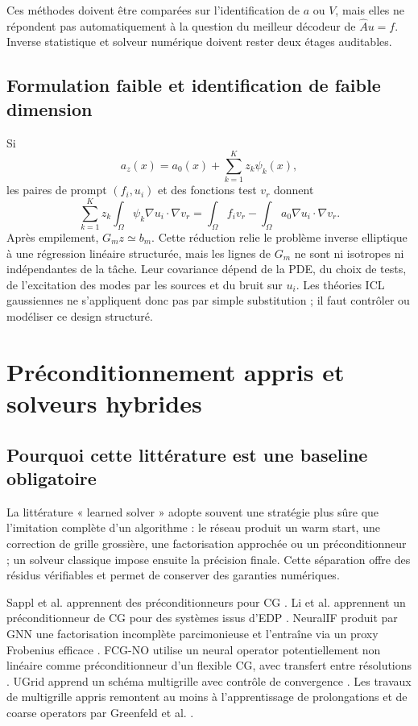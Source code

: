 \documentclass[11pt,a4paper]{article}
\begin{document}
Ces méthodes doivent être comparées sur l'identification de $a$ ou $V$, mais
elles ne répondent pas automatiquement à la question du meilleur décodeur de
$\widehat A u=f$. Inverse statistique et solveur numérique doivent rester deux
étages auditables.

\subsection{Formulation faible et identification de faible dimension}

Si
\[
  a_z(x)=a_0(x)+\sum_{k=1}^K z_k\psi_k(x),
\]
les paires de prompt $(f_i,u_i)$ et des fonctions test $v_r$ donnent
\[
  \sum_{k=1}^K z_k
  \int_\Omega \psi_k\nabla u_i\!\cdot\nabla v_r
  =
  \int_\Omega f_i v_r-
  \int_\Omega a_0\nabla u_i\!\cdot\nabla v_r.
\]
Après empilement, $G_mz\simeq b_m$. Cette réduction relie le problème inverse
elliptique à une régression linéaire structurée, mais les lignes de $G_m$ ne
sont ni isotropes ni indépendantes de la tâche. Leur covariance dépend de la
PDE, du choix de tests, de l'excitation des modes par les sources et du bruit
sur $u_i$. Les théories ICL gaussiennes ne s'appliquent donc pas par simple
substitution ; il faut contrôler ou modéliser ce design structuré.

\section{Préconditionnement appris et solveurs hybrides}

\subsection{Pourquoi cette littérature est une baseline obligatoire}

La littérature « learned solver » adopte souvent une stratégie plus sûre que
l'imitation complète d'un algorithme : le réseau produit un warm start, une
correction de grille grossière, une factorisation approchée ou un
préconditionneur ; un solveur classique impose ensuite la précision finale.
Cette séparation offre des résidus vérifiables et permet de conserver des
garanties numériques.

Sappl et al. apprennent des préconditionneurs pour CG
\cite{sappl2019preconditioners}. Li et al. apprennent un préconditionneur de
CG pour des systèmes issus d'EDP \cite{li2023preconditioner}. NeuralIF produit
par GNN une factorisation incomplète parcimonieuse et l'entraîne via un proxy
Frobenius efficace \cite{hausner2023neuralif}. FCG-NO utilise un neural
operator potentiellement non linéaire comme préconditionneur d'un flexible CG,
avec transfert entre résolutions \cite{rudikov2024fcgno}. UGrid apprend un
schéma multigrille avec contrôle de convergence \cite{han2024ugrid}. Les
travaux de multigrille appris remontent au moins à l'apprentissage de
prolongations et de coarse operators par Greenfeld et al.
\cite{greenfeld2019multigrid}.
\end{document}
